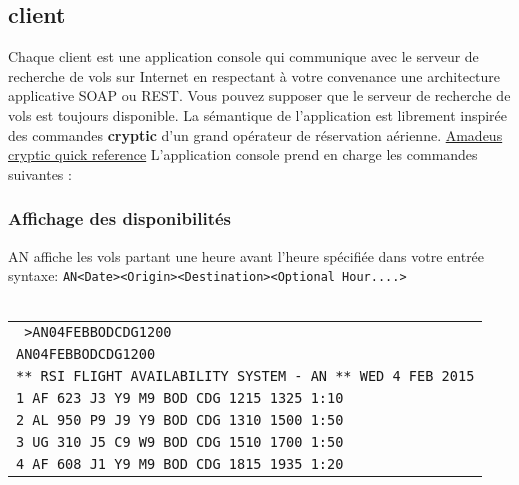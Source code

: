 \documentclass[a4paper,11pt]{article}
\begin{document}
\subsection*{client}
Chaque client est une application console qui
communique avec le serveur de recherche de vols sur Internet en respectant à votre convenance une architecture 
applicative SOAP ou REST.
Vous pouvez supposer que le serveur de recherche de vols est toujours disponible. La sémantique de l'application est librement inspirée des commandes \textbf{cryptic} d'un grand opérateur de réservation aérienne. \href{http://petitlien.fr/cryptic}{Amadeus cryptic quick reference}
L'application console prend en charge les commandes suivantes :
\subsubsection*{Affichage des disponibilités}
AN affiche les vols partant une heure avant l'heure spécifiée dans votre entrée\\
syntaxe: \texttt{AN<Date><Origin><Destination><Optional Hour....>}\\ \\
\begin{centering}
\begin{tabular}{|p{\linewidth}|}
 \hline
 \texttt{ >AN04FEBBODCDG1200 }\\
 \texttt{AN04FEBBODCDG1200}\\
 \texttt{** RSI FLIGHT AVAILABILITY SYSTEM - AN **               WED 4 FEB 2015}\\
 \texttt{1\hspace{10 mm}    AF 623 J3 Y9 M9\hspace{10 mm}           BOD CDG\hspace{10 mm}     1215\hspace{5 mm}   1325\hspace{5 mm}    1:10}\\
 \texttt{2\hspace{10 mm}    AL 950 P9 J9 Y9\hspace{10 mm}           BOD CDG\hspace{10 mm}     1310\hspace{5 mm}   1500\hspace{5 mm}    1:50}\\
 \texttt{3\hspace{10 mm}    UG 310 J5 C9 W9\hspace{10 mm}           BOD CDG\hspace{10 mm}     1510\hspace{5 mm}   1700\hspace{5 mm}    1:50}\\
 \texttt{4\hspace{10 mm}    AF 608 J1 Y9 M9\hspace{10 mm}           BOD CDG\hspace{10 mm}     1815\hspace{5 mm}   1935\hspace{5 mm}    1:20}\\
 \end{tabular}
\end{centering} \\
\end{document}
